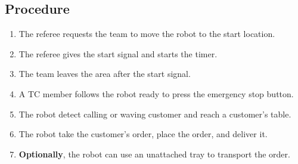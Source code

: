 \subsection*{Procedure}

\begin{enumerate}
	\item The referee requests the team to move the robot to the start location.
	\item The referee gives the start signal and starts the timer.
	\item The team leaves the area after the start signal.
	\item A TC member follows the robot ready to press the emergency stop button. 
	\item The robot detect calling or waving customer and reach a customer's table.
	\item The robot take the customer's order, place the order, and deliver it.
	\item \textbf{Optionally}, the robot can use an unattached tray to transport the order.
\end{enumerate}


